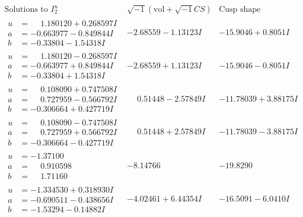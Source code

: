 \documentclass[1p]{elsarticle_modified}
\theoremstyle{definition}
\newcommand{\I}{\sqrt{-1}}
\begin{document}
$$\begin{array}{c|c|c}  
\text{Solutions to }I^u_{2}& \I (\text{vol} + \sqrt{-1}CS) & \text{Cusp shape}\\
 \hline 
\begin{aligned}
u &= \phantom{-}1.180120 + 0.268597 I \\
a &= -0.663977 - 0.849844 I \\
b &= -0.33804 - 1.54318 I\end{aligned}
 & -2.68559 - 1.13123 I & -15.9046 + 0.8051 I \\ \hline\begin{aligned}
u &= \phantom{-}1.180120 - 0.268597 I \\
a &= -0.663977 + 0.849844 I \\
b &= -0.33804 + 1.54318 I\end{aligned}
 & -2.68559 + 1.13123 I & -15.9046 - 0.8051 I \\ \hline\begin{aligned}
u &= \phantom{-}0.108090 + 0.747508 I \\
a &= \phantom{-}0.727959 - 0.566792 I \\
b &= -0.306664 + 0.427719 I\end{aligned}
 & \phantom{-}0.51448 - 2.57849 I & -11.78039 + 3.88175 I \\ \hline\begin{aligned}
u &= \phantom{-}0.108090 - 0.747508 I \\
a &= \phantom{-}0.727959 + 0.566792 I \\
b &= -0.306664 - 0.427719 I\end{aligned}
 & \phantom{-}0.51448 + 2.57849 I & -11.78039 - 3.88175 I \\ \hline\begin{aligned}
u &= -1.37100\phantom{ +0.000000I} \\
a &= \phantom{-}0.910598\phantom{ +0.000000I} \\
b &= \phantom{-}1.71160\phantom{ +0.000000I}\end{aligned}
 & -8.14766\phantom{ +0.000000I} & -19.8290\phantom{ +0.000000I} \\ \hline\begin{aligned}
u &= -1.334530 + 0.318930 I \\
a &= -0.690511 - 0.438656 I \\
b &= -1.53294 - 0.14882 I\end{aligned}
 & -4.02461 + 6.44354 I & -16.5091 - 6.0410 I \\ \hline\begin{aligned}

\end{aligned}
\end{array}$$
\end{document}
